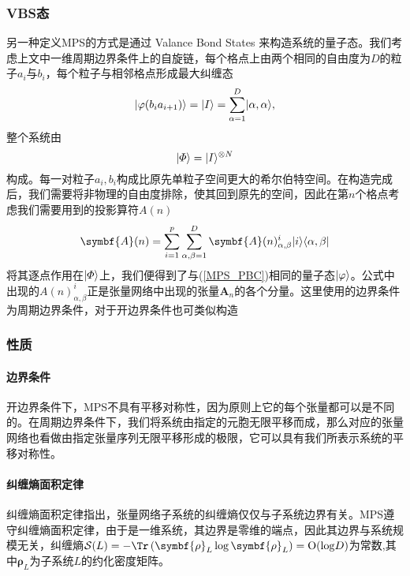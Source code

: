 \subsubsection{VBS态}
另一种定义MPS的方式是通过 Valance Bond States \cite[8]{dongZhangLiangWangLuoSuanFaCongBoSeZiXiTongDaoFeiMiZiXiTong2017}来构造系统的量子态。我们考虑上文中一维周期边界条件上的自旋链，每个格点上由两个相同的自由度为$D$的粒子$a_i$与$b_i$，每个粒子与相邻格点形成最大纠缠态
\begin{equation}
\lvert\varphi(b_i a_{i+1})\rangle = \lvert I\rangle = \sum_{\alpha=1}^D \lvert\alpha,\alpha\rangle,
\end{equation}
整个系统由
\begin{equation}
\lvert\varPhi\rangle = \lvert I\rangle^{\otimes N}
\end{equation}
构成。每一对粒子$a_i,b_i$构成比原先单粒子空间更大的希尔伯特空间。在构造完成后，我们需要将非物理的自由度排除，使其回到原先的空间，因此在第$n$个格点考虑我们需要用到的投影算符$A(n)$
\begin{equation}
\symbf{A}(n) = \sum_{i=1}^p\sum_{\alpha,\beta=1}^D \symbf{A}(n)^i_{\alpha,\beta}\ket{i}\bra{\alpha,\beta}
\end{equation}
将其逐点作用在$\lvert\varPhi\rangle$上\cite[16]{bridgemanHandwavingInterpretiveDance2017}，我们便得到了与(\ref{MPS_PBC})相同的量子态$\lvert\varphi\rangle$。公式中出现的$A(n)^i_{\alpha,\beta}$正是张量网络中出现的张量$\symbf{A}_n$的各个分量。这里使用的边界条件为周期边界条件，对于开边界条件也可类似构造
\subsubsection{性质}

\paragraph{边界条件}

开边界条件下，MPS不具有平移对称性，因为原则上它的每个张量都可以是不同的。在周期边界条件下，我们将系统由指定的元胞无限平移而成，那么对应的张量网络也看做由指定张量序列无限平移形成的极限，它可以具有我们所表示系统的平移对称性。

\paragraph{纠缠熵面积定律}

纠缠熵面积定律指出，张量网络子系统的纠缠熵仅仅与子系统边界有关。MPS遵守纠缠熵面积定律，由于是一维系统，其边界是零维的端点，因此其边界与系统规模无关，纠缠熵$\mathcal{S}(L)=-\Tr\left(\symbf{\rho}_L\log\symbf{\rho}_L\right)=\mathrm{O}(\log\! D)$为常数\cite{PracticalIntroductionTensor2014},其中$\symbf{\rho}_L$为子系统$L$的约化密度矩阵。

